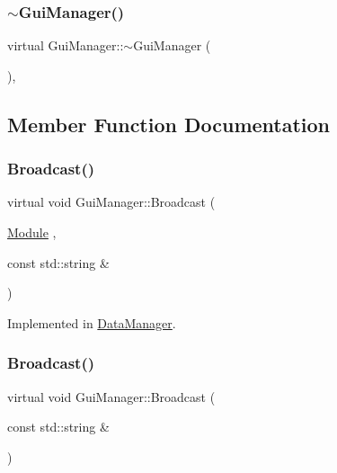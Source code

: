 \subsubsection{\texorpdfstring{$\sim$GuiManager()}{~GuiManager()}}
{\footnotesize\ttfamily virtual Gui\+Manager\+::$\sim$\+Gui\+Manager (\begin{DoxyParamCaption}{ }\end{DoxyParamCaption})\hspace{0.3cm}{\ttfamily [inline]}, {\ttfamily [virtual]}}



\subsection{Member Function Documentation}
\mbox{\label{class_gui_manager_a32754b1f01775df580985ee9e6318a2f}} 
\subsubsection{\texorpdfstring{Broadcast()}{Broadcast()}\hspace{0.1cm}{\footnotesize\ttfamily [1/2]}}
{\footnotesize\ttfamily virtual void Gui\+Manager\+::\+Broadcast (\begin{DoxyParamCaption}\item[{\mbox{\hyperlink{_mediator_2_mediator_2_commons_8h_a88683b64d84542943724ba0f211153af}{Module}}}]{,  }\item[{const std\+::string \&}]{ }\end{DoxyParamCaption})\hspace{0.3cm}{\ttfamily [pure virtual]}}



Implemented in \mbox{\hyperlink{class_data_manager_a645613a4c6cca77e73aff3c9a05fd696}{Data\+Manager}}.

\mbox{\label{class_gui_manager_a062c8b90e738509c1679c1fe50b1dddc}} 
\subsubsection{\texorpdfstring{Broadcast()}{Broadcast()}\hspace{0.1cm}{\footnotesize\ttfamily [2/2]}}
{\footnotesize\ttfamily virtual void Gui\+Manager\+::\+Broadcast (\begin{DoxyParamCaption}\item[{const std\+::string \&}]{ }\end{DoxyParamCaption})\hspace{0.3cm}{\ttfamily [pure virtual]}}



